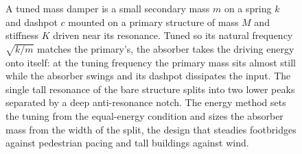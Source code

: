\begin{figure}[htbp]
\caption[Tuned mass damper and its split response]{A tuned mass damper is a
small secondary mass $m$ on a spring $k$ and dashpot $c$ mounted on a primary
structure of mass $M$ and stiffness $K$ driven near its resonance. Tuned so
its natural frequency $\sqrt{k/m}$ matches the primary's, the absorber takes
the driving energy onto itself: at the tuning frequency the primary mass sits
almost still while the absorber swings and its dashpot dissipates the input.
The single tall resonance of the bare structure splits into two lower peaks
separated by a deep anti-resonance notch. The energy method sets the tuning
from the equal-energy condition and sizes the absorber mass from the width of
the split, the design that steadies footbridges against pedestrian pacing and
tall buildings against wind.}
\label{fig:vol03ch05:tuned-mass-damper}
\end{figure}

